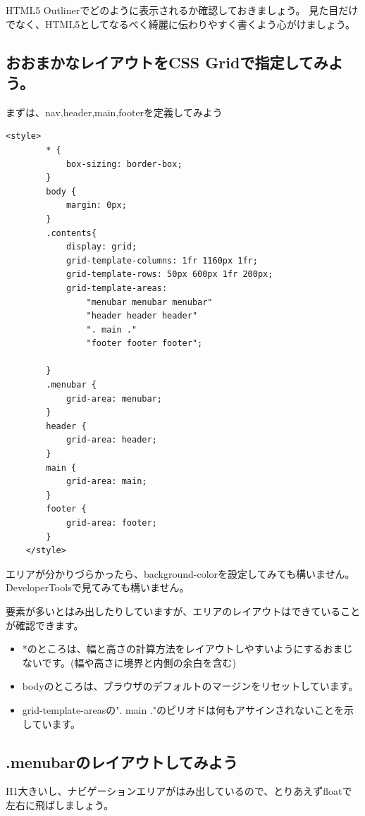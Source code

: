 \documentclass[mingoth,11pt,a4j,uplatex,dvipdfmx]{jsarticle}
\begin{document}
HTML5 Outlinerでどのように表示されるか確認しておきましょう。
見た目だけでなく、HTML5としてなるべく綺麗に伝わりやすく書くよう心がけましょう。

\subsection{おおまかなレイアウトをCSS Gridで指定してみよう。}
まずは、nav,header,main,footerを定義してみよう

\begin{lstlisting}[caption=おおまかな構造のCSS]
    <style>
        * {
            box-sizing: border-box;
        }
        body {
            margin: 0px;
        }
        .contents{
            display: grid;
            grid-template-columns: 1fr 1160px 1fr;
            grid-template-rows: 50px 600px 1fr 200px;
            grid-template-areas: 
                "menubar menubar menubar"
                "header header header"
                ". main ."
                "footer footer footer";

        }
        .menubar {
            grid-area: menubar;
        }
        header {
            grid-area: header;
        }
        main {
            grid-area: main;
        }
        footer {
            grid-area: footer;
        }
    </style>
\end{lstlisting}

エリアが分かりづらかったら、background-colorを設定してみても構いません。DeveloperToolsで見てみても構いません。

要素が多いとはみ出したりしていますが、エリアのレイアウトはできていることが確認できます。

\begin{itemize}
\item *のところは、幅と高さの計算方法をレイアウトしやすいようにするおまじないです。(幅や高さに境界と内側の余白を含む)
\item bodyのところは、ブラウザのデフォルトのマージンをリセットしています。
\item grid-template-areasの". main ."のピリオドは何もアサインされないことを示しています。
\end{itemize}

\subsection{.menubarのレイアウトしてみよう}
H1大きいし、ナビゲーションエリアがはみ出しているので、とりあえずfloatで左右に飛ばしましょう。
\end{document}
